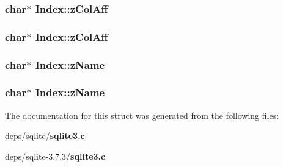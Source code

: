 \subsubsection{\setlength{\rightskip}{0pt plus 5cm}char$\ast$ \bf{Index::z\-Col\-Aff}}\label{structIndex_3af03b386460543f673ea71c53182796}


\subsubsection{\setlength{\rightskip}{0pt plus 5cm}char$\ast$ \bf{Index::z\-Col\-Aff}}\label{structIndex_3af03b386460543f673ea71c53182796}


\subsubsection{\setlength{\rightskip}{0pt plus 5cm}char$\ast$ \bf{Index::z\-Name}}\label{structIndex_9769cc68a0f6559136dadacf495a72c8}


\subsubsection{\setlength{\rightskip}{0pt plus 5cm}char$\ast$ \bf{Index::z\-Name}}\label{structIndex_9769cc68a0f6559136dadacf495a72c8}




The documentation for this struct was generated from the following files:\begin{CompactItemize}
\item 
deps/sqlite/\bf{sqlite3.c}\item 
deps/sqlite-3.7.3/\bf{sqlite3.c}\end{CompactItemize}

